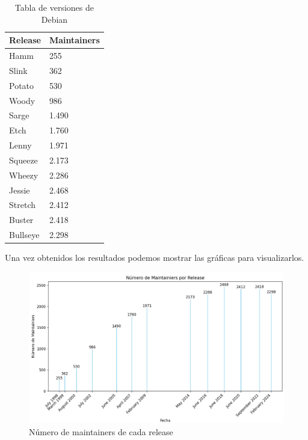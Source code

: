\documentclass[a4paper, 12pt]{book}
\begin{document}
	\begin{table}[h]
		\begin{center}
			\begin{tabular}{|l|l|}
				\hline
				Release  & Maintainers \\ \hline
				Hamm     & 255         \\ \hline
				Slink    & 362         \\ \hline
				Potato   & 530         \\ \hline
				Woody    & 986         \\ \hline
				Sarge    & 1.490        \\ \hline
				Etch     & 1.760        \\ \hline
				Lenny    & 1.971        \\ \hline
				Squeeze  & 2.173        \\ \hline
				Wheezy   & 2.286        \\ \hline
				Jessie   & 2.468        \\ \hline
				Stretch  & 2.412        \\ \hline
				Buster   & 2.418        \\ \hline
				Bullseye & 2.298        \\ \hline
			\end{tabular}
			\caption{Tabla de versiones de Debian}
		\end{center}
	\end{table}


Una vez obtenidos los resultados podemos mostrar las gráficas para visualizarlos.
\begin{figure}[h]
	\centering
	\includegraphics[width=15cm, keepaspectratio]{img/Figura2_buena_maintainers.png}
	\caption{Número de maintainers de cada release}
	\label{fig:mantenedores}
\end{figure}
\end{document}
